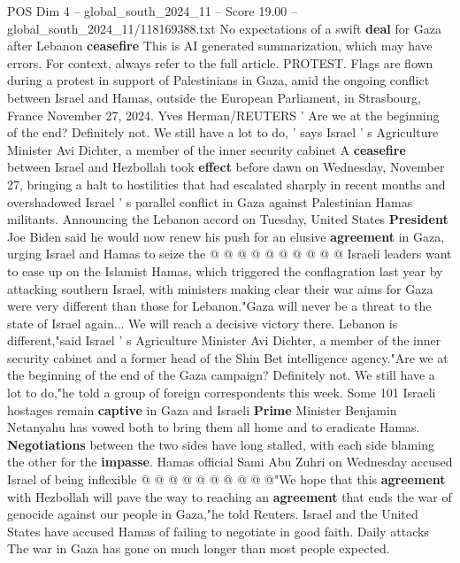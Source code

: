 \begin{textsample}{POS Dim 4 – global\_south\_2024\_11 – Score 19.00 – global\_south\_2024\_11/118169388.txt}  \label{ex:f4_pos_252}
No expectations of a swift \textbf{deal} for Gaza after Lebanon \textbf{ceasefire} This is AI generated summarization, which may have errors.
For context, always refer to the full article.
PROTEST.
Flags are flown during a protest in support of Palestinians in Gaza, amid the ongoing conflict between Israel and Hamas, outside the European Parliament, in Strasbourg, France November 27, 2024.
Yves Herman/REUTERS ' Are we at the beginning of the end?
Definitely not.
We still have a lot to do, ' says Israel ' s Agriculture Minister Avi Dichter, a member of the inner security cabinet A \textbf{ceasefire} between Israel and Hezbollah took \textbf{effect} before dawn on Wednesday, November 27, bringing a halt to hostilities that had escalated sharply in recent months and overshadowed Israel ' s parallel conflict in Gaza against Palestinian Hamas militants.
Announcing the Lebanon accord on Tuesday, United States \textbf{President} Joe Biden said he would now renew his push for an elusive \textbf{agreement} in Gaza, urging Israel and Hamas to seize the @ @ @ @ @ @ @ @ @ @ Israeli leaders want to ease up on the Islamist Hamas, which triggered the conflagration last year by attacking southern Israel, with ministers making clear their war aims for Gaza were very different than those for Lebanon."Gaza will never be a threat to the state of Israel again...
We will reach a decisive victory there.
Lebanon is different,"said Israel ' s Agriculture Minister Avi Dichter, a member of the inner security cabinet and a former head of the Shin Bet intelligence agency."Are we at the beginning of the end of the Gaza campaign?
Definitely not.
We still have a lot to do,"he told a group of foreign correspondents this week.
Some 101 Israeli hostages remain \textbf{captive} in Gaza and Israeli \textbf{Prime} Minister Benjamin Netanyahu has vowed both to bring them all home and to eradicate Hamas. \textbf{Negotiations} between the two sides have long stalled, with each side blaming the other for the \textbf{impasse}.
Hamas official Sami Abu Zuhri on Wednesday accused Israel of being inflexible @ @ @ @ @ @ @ @ @ @"We hope that this \textbf{agreement} with Hezbollah will pave the way to reaching an \textbf{agreement} that ends the war of genocide against our people in Gaza,"he told Reuters.
Israel and the United States have accused Hamas of failing to negotiate in good faith.
Daily attacks The war in Gaza has gone on much longer than most people expected.

\end{textsample}
